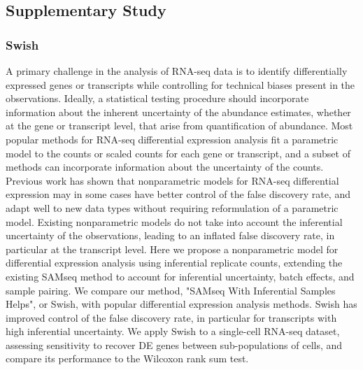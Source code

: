 \subsection{Supplementary Study}
\subsubsection{Swish ~\citep{zhu2019nonparametric}}
A primary challenge in the analysis of RNA-seq data is to identify differentially 
expressed genes or transcripts while controlling for technical biases present in 
the observations. Ideally, a statistical testing procedure should incorporate 
information about the inherent uncertainty of the abundance estimates, whether at 
the gene or transcript level, that arise from quantification of abundance. Most 
popular methods for RNA-seq differential expression analysis fit a parametric model 
to the counts or scaled counts for each gene or transcript, and a subset of methods 
can incorporate information about the uncertainty of the counts. Previous work has 
shown that nonparametric models for RNA-seq differential expression may in some cases 
have better control of the false discovery rate, and adapt well to new data types 
without requiring reformulation of a parametric model. Existing nonparametric models 
do not take into account the inferential uncertainty of the observations, leading to 
an inflated false discovery rate, in particular at the transcript level. Here we 
propose a nonparametric model for differential expression analysis using inferential 
replicate counts, extending the existing SAMseq method to account for inferential 
uncertainty, batch effects, and sample pairing. We compare our method, 
"SAMseq With Inferential Samples Helps", or Swish, with popular differential 
expression analysis methods. Swish has improved control of the false discovery rate, 
in particular for transcripts with high inferential uncertainty. We apply Swish to 
a single-cell RNA-seq dataset, assessing sensitivity to recover DE genes between 
sub-populations of cells, and compare its performance to the Wilcoxon rank sum test.

